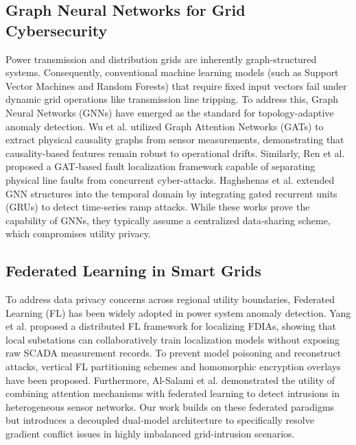 \documentclass[conference]{IEEEtran}
\begin{document}
\subsection{Graph Neural Networks for Grid Cybersecurity}
Power transmission and distribution grids are inherently graph-structured systems. Consequently, conventional machine learning models (such as Support Vector Machines and Random Forests) that require fixed input vectors fail under dynamic grid operations like transmission line tripping. To address this, Graph Neural Networks (GNNs) have emerged as the standard for topology-adaptive anomaly detection. Wu et al. \cite{wu_causality} utilized Graph Attention Networks (GATs) to extract physical causality graphs from sensor measurements, demonstrating that causality-based features remain robust to operational drifts. Similarly, Ren et al. \cite{ren_pcpa} proposed a GAT-based fault localization framework capable of separating physical line faults from concurrent cyber-attacks. Haghshenas et al. \cite{haghshenas_temporal} extended GNN structures into the temporal domain by integrating gated recurrent units (GRUs) to detect time-series ramp attacks. While these works prove the capability of GNNs, they typically assume a centralized data-sharing scheme, which compromises utility privacy.

\subsection{Federated Learning in Smart Grids}
To address data privacy concerns across regional utility boundaries, Federated Learning (FL) has been widely adopted in power system anomaly detection. Yang et al. \cite{yang_fed_loc} proposed a distributed FL framework for localizing FDIAs, showing that local substations can collaboratively train localization models without exposing raw SCADA measurement records. To prevent model poisoning and reconstruct attacks, vertical FL partitioning schemes \cite{li_vertical} and homomorphic encryption overlays \cite{lu_privacy} have been proposed. Furthermore, Al-Salami et al. \cite{alsalami_fed_attention} demonstrated the utility of combining attention mechanisms with federated learning to detect intrusions in heterogeneous sensor networks. Our work builds on these federated paradigms but introduces a decoupled dual-model architecture to specifically resolve gradient conflict issues in highly imbalanced grid-intrusion scenarios.
\end{document}
